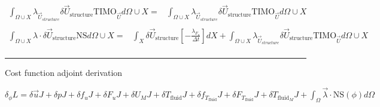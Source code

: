 \documentclass[10pt]{article} %
\begin{document}
\begin{center}
\begin{align*}
	\int_{\Omega \cup X} \lambda_{\vec{U}_{structure}} \delta \vec{U}_{\text{structure}} \text{TIMO}_{\vec{U}} d\Omega \cup X =& \int_{\Omega \cup X} \lambda_{\vec{U}_{structure}} \delta \vec{U}_{\text{structure}} \text{TIMO}_{\vec{U}} d\Omega \cup X\\
\end{align*}
\begin{align*}
	\int_{\Omega \cup X} \lambda \cdot \delta \vec{U}_{\text{structure}} \text{NS}d\Omega \cup X 
	=&\int_{X} \delta \vec{U}_{\text{structure}} \left[ - \frac{\lambda_{F_u}}{\Delta t} \right] d X + \int_{\Omega \cup X} \lambda_{\vec{U}_{structure}} \delta \vec{U}_{\text{structure}} \text{TIMO}_{\vec{U}} d\Omega \cup X\\
\end{align*}
\noindent\rule[1ex]{\textwidth}{1pt}
\newpage
\begin{flushleft}
	Cost function adjoint derivation
\end{flushleft}
	$\delta_\phi L = \delta \vec{u} J + \delta p  J + \delta f_u J + \delta F_u J + \delta U_M J +
	\delta T_{\text{fluid}} J + \delta f_{T_{\text{fluid}}} J + \delta F_{T_{\text{fluid}}} J + \delta T_{\text{fluid}_M} J + \int_{\Omega} \vec{\lambda} \cdot \text{NS}(\phi) d\Omega $\\
	

\end{center}
\end{document}
